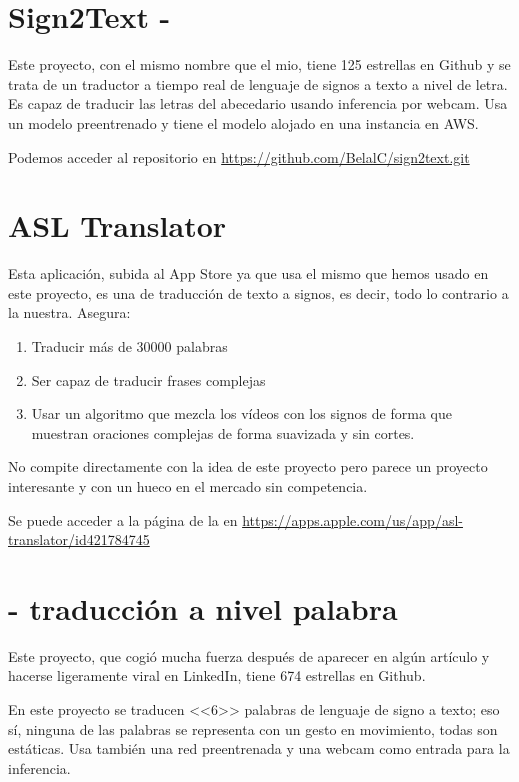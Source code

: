 
\section{Sign2Text - }

Este proyecto, con el mismo nombre que el mio, tiene 125 estrellas en Github y se trata de un traductor a tiempo real de lenguaje de signos  a texto a nivel de letra. Es capaz de traducir las letras del abecedario usando inferencia por webcam. Usa un modelo preentrenado  y tiene el modelo alojado en una instancia en AWS.

Podemos acceder al repositorio en \url{https://github.com/BelalC/sign2text.git}

\section{ASL Translator}

Esta aplicación, subida al App Store ya que usa el mismo  que hemos usado en este proyecto, es una  de traducción de texto a signos, es decir, todo lo contrario a la nuestra. Asegura:

\begin{enumerate}
  \item Traducir más de 30000 palabras
  \item Ser capaz de traducir frases complejas
  \item Usar un algoritmo que mezcla los vídeos con los signos de forma que muestran oraciones complejas de forma suavizada y sin cortes.
\end{enumerate}

No compite directamente con la idea de este proyecto pero parece un proyecto interesante y con un hueco en el mercado sin competencia.

Se puede acceder a la página de la  en \url{https://apps.apple.com/us/app/asl-translator/id421784745}

\section{ - traducción a nivel palabra}

Este proyecto, que cogió mucha fuerza después de aparecer en algún artículo y hacerse ligeramente viral en LinkedIn, tiene 674 estrellas en Github.

En este proyecto se traducen <<6>> palabras de lenguaje de signo a texto; eso sí, ninguna de las palabras se representa con un gesto en movimiento, todas son estáticas. Usa también una red preentrenada y una webcam como entrada para la inferencia.


